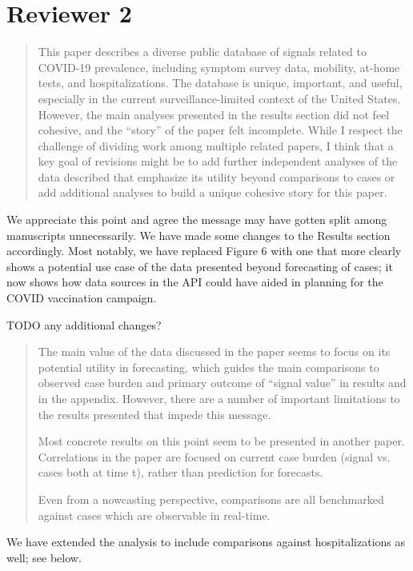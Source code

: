 \documentclass[11pt]{article}
\begin{document}
\section*{Reviewer 2}

\begin{quote}
  This paper describes a diverse public database of signals related to COVID-19
  prevalence, including symptom survey data, mobility, at-home tests, and
  hospitalizations. The database is unique, important, and useful, especially in
  the current surveillance-limited context of the United States. However, the
  main analyses presented in the results section did not feel cohesive, and the
  ``story'' of the paper felt incomplete. While I respect the challenge of
  dividing work among multiple related papers, I think that a key goal of
  revisions might be to add further independent analyses of the data described
  that emphasize its utility beyond comparisons to cases or add additional
  analyses to build a unique cohesive story for this paper.
\end{quote}
We appreciate this point and agree the message may have gotten split among
manuscripts unnecessarily. We have made some changes to the Results section
accordingly. Most notably, we have replaced Figure 6 with one that more clearly
shows a potential use case of the data presented beyond forecasting of cases; it
now shows how data sources in the API could have aided in planning for the COVID
vaccination campaign.

TODO any additional changes?

\begin{quote}
  The main value of the data discussed in the paper seems to focus on its
  potential utility in forecasting, which guides the main comparisons to
  observed case burden and primary outcome of ``signal value'' in results and in
  the appendix. However, there are a number of important limitations to the
  results presented that impede this message.

  Most concrete results on this point seem to be presented in another paper.
  Correlations in the paper are focused on current case burden (signal vs. cases
  both at time t), rather than prediction for forecasts.

  Even from a nowcasting perspective, comparisons are all benchmarked against
  cases which are observable in real-time.
\end{quote}
We have extended the analysis to include comparisons against hospitalizations as
well; see below.
\end{document}
